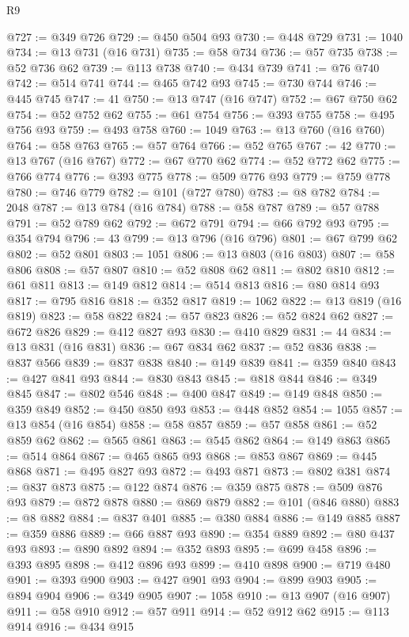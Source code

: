 \begin{lexlean}{R9}
\begin{coremodule}
@727 := @349 @726
@729 := @450 @504 @93
@730 := @448 @729
@731 := 1040
@734 := @13 @731 (@16 @731)
@735 := @58 @734
@736 := @57 @735
@738 := @52 @736 @62
@739 := @113 @738
@740 := @434 @739
@741 := @76 @740
@742 := @514 @741
@744 := @465 @742 @93
@745 := @730 @744
@746 := @445 @745
@747 := 41
@750 := @13 @747 (@16 @747)
@752 := @67 @750 @62
@754 := @52 @752 @62
@755 := @61 @754
@756 := @393 @755
@758 := @495 @756 @93
@759 := @493 @758
@760 := 1049
@763 := @13 @760 (@16 @760)
@764 := @58 @763
@765 := @57 @764
@766 := @52 @765
@767 := 42
@770 := @13 @767 (@16 @767)
@772 := @67 @770 @62
@774 := @52 @772 @62
@775 := @766 @774
@776 := @393 @775
@778 := @509 @776 @93
@779 := @759 @778
@780 := @746 @779
@782 := @101 (@727 @780)
@783 := @8 @782
@784 := 2048
@787 := @13 @784 (@16 @784)
@788 := @58 @787
@789 := @57 @788
@791 := @52 @789 @62
@792 := @672 @791
@794 := @66 @792 @93
@795 := @354 @794
@796 := 43
@799 := @13 @796 (@16 @796)
@801 := @67 @799 @62
@802 := @52 @801
@803 := 1051
@806 := @13 @803 (@16 @803)
@807 := @58 @806
@808 := @57 @807
@810 := @52 @808 @62
@811 := @802 @810
@812 := @61 @811
@813 := @149 @812
@814 := @514 @813
@816 := @80 @814 @93
@817 := @795 @816
@818 := @352 @817
@819 := 1062
@822 := @13 @819 (@16 @819)
@823 := @58 @822
@824 := @57 @823
@826 := @52 @824 @62
@827 := @672 @826
@829 := @412 @827 @93
@830 := @410 @829
@831 := 44
@834 := @13 @831 (@16 @831)
@836 := @67 @834 @62
@837 := @52 @836
@838 := @837 @566
@839 := @837 @838
@840 := @149 @839
@841 := @359 @840
@843 := @427 @841 @93
@844 := @830 @843
@845 := @818 @844
@846 := @349 @845
@847 := @802 @546
@848 := @400 @847
@849 := @149 @848
@850 := @359 @849
@852 := @450 @850 @93
@853 := @448 @852
@854 := 1055
@857 := @13 @854 (@16 @854)
@858 := @58 @857
@859 := @57 @858
@861 := @52 @859 @62
@862 := @565 @861
@863 := @545 @862
@864 := @149 @863
@865 := @514 @864
@867 := @465 @865 @93
@868 := @853 @867
@869 := @445 @868
@871 := @495 @827 @93
@872 := @493 @871
@873 := @802 @381
@874 := @837 @873
@875 := @122 @874
@876 := @359 @875
@878 := @509 @876 @93
@879 := @872 @878
@880 := @869 @879
@882 := @101 (@846 @880)
@883 := @8 @882
@884 := @837 @401
@885 := @380 @884
@886 := @149 @885
@887 := @359 @886
@889 := @66 @887 @93
@890 := @354 @889
@892 := @80 @437 @93
@893 := @890 @892
@894 := @352 @893
@895 := @699 @458
@896 := @393 @895
@898 := @412 @896 @93
@899 := @410 @898
@900 := @719 @480
@901 := @393 @900
@903 := @427 @901 @93
@904 := @899 @903
@905 := @894 @904
@906 := @349 @905
@907 := 1058
@910 := @13 @907 (@16 @907)
@911 := @58 @910
@912 := @57 @911
@914 := @52 @912 @62
@915 := @113 @914
@916 := @434 @915

\end{coremodule}
\end{lexlean}
